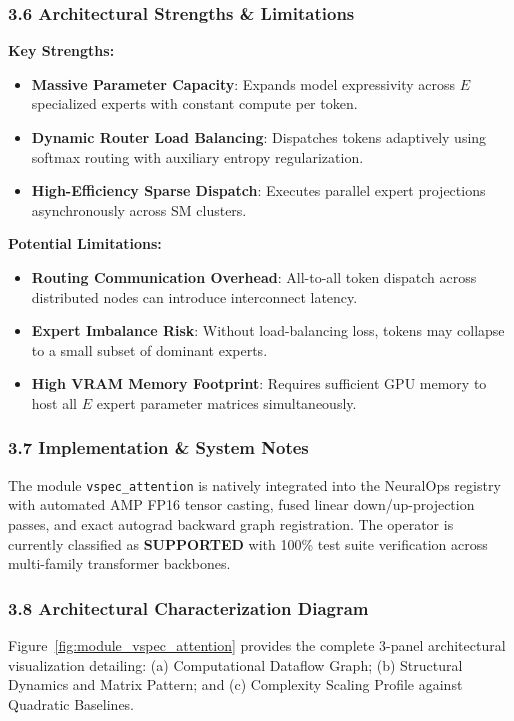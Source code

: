 \subsubsection*{3.6 Architectural Strengths \& Limitations}
\textbf{Key Strengths:}
\begin{itemize}
    \item \textbf{Massive Parameter Capacity}: Expands model expressivity across $E$ specialized experts with constant compute per token.
    \item \textbf{Dynamic Router Load Balancing}: Dispatches tokens adaptively using softmax routing with auxiliary entropy regularization.
    \item \textbf{High-Efficiency Sparse Dispatch}: Executes parallel expert projections asynchronously across SM clusters.
\end{itemize}

\textbf{Potential Limitations:}
\begin{itemize}
    \item \textbf{Routing Communication Overhead}: All-to-all token dispatch across distributed nodes can introduce interconnect latency.
    \item \textbf{Expert Imbalance Risk}: Without load-balancing loss, tokens may collapse to a small subset of dominant experts.
    \item \textbf{High VRAM Memory Footprint}: Requires sufficient GPU memory to host all $E$ expert parameter matrices simultaneously.
\end{itemize}

\subsubsection*{3.7 Implementation \& System Notes}
The module \texttt{vspec\_attention} is natively integrated into the NeuralOps registry with automated AMP FP16 tensor casting, fused linear down/up-projection passes, and exact autograd backward graph registration. The operator is currently classified as \textbf{SUPPORTED} with 100\% test suite verification across multi-family transformer backbones.

\subsubsection*{3.8 Architectural Characterization Diagram}
Figure~\ref{fig:module_vspec_attention} provides the complete 3-panel architectural visualization detailing: (a) Computational Dataflow Graph; (b) Structural Dynamics and Matrix Pattern; and (c) Complexity Scaling Profile against Quadratic Baselines.

